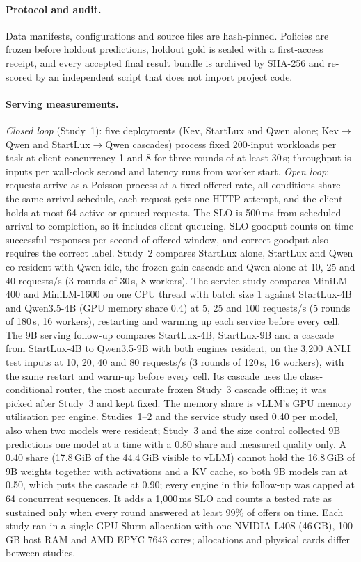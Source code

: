 \documentclass[11pt]{article}
\begin{document}
\paragraph{Protocol and audit.}
Data manifests, configurations and source files are hash-pinned. Policies are frozen before holdout predictions, holdout gold is sealed with a first-access receipt, and every accepted final result bundle is archived by SHA-256 and re-scored by an independent script that does not import project code.

\paragraph{Serving measurements.}
\emph{Closed loop} (Study~1): five deployments (Kev, StartLux and Qwen alone; Kev$\to$Qwen and StartLux$\to$Qwen cascades) process fixed 200-input workloads per task at client concurrency 1 and 8 for three rounds of at least 30\,s; throughput is inputs per wall-clock second and latency runs from worker start. \emph{Open loop}: requests arrive as a Poisson process at a fixed offered rate, all conditions share the same arrival schedule, each request gets one HTTP attempt, and the client holds at most 64 active or queued requests. The SLO is 500\,ms from scheduled arrival to completion, so it includes client queueing. SLO goodput counts on-time successful responses per second of offered window, and correct goodput also requires the correct label. Study~2 compares StartLux alone, StartLux and Qwen co-resident with Qwen idle, the frozen gain cascade and Qwen alone at 10, 25 and 40 requests/s (3 rounds of 30\,s, 8 workers). The service study compares MiniLM-400 and MiniLM-1600 on one CPU thread with batch size 1 against StartLux-4B and Qwen3.5-4B (GPU memory share 0.4) at 5, 25 and 100 requests/s (5 rounds of 180\,s, 16 workers), restarting and warming up each service before every cell. The 9B serving follow-up compares StartLux-4B, StartLux-9B and a cascade from StartLux-4B to Qwen3.5-9B with both engines resident, on the 3,200 ANLI test inputs at 10, 20, 40 and 80 requests/s (3 rounds of 120\,s, 16 workers), with the same restart and warm-up before every cell. Its cascade uses the class-conditional router, the most accurate frozen Study~3 cascade offline; it was picked after Study~3 and kept fixed. The memory share is vLLM's GPU memory utilisation per engine. Studies~1--2 and the service study used 0.40 per model, also when two models were resident; Study~3 and the size control collected 9B predictions one model at a time with a 0.80 share and measured quality only. A 0.40 share (17.8\,GiB of the 44.4\,GiB visible to vLLM) cannot hold the 16.8\,GiB of 9B weights together with activations and a KV cache, so both 9B models ran at 0.50, which puts the cascade at 0.90; every engine in this follow-up was capped at 64 concurrent sequences. It adds a 1,000\,ms SLO and counts a tested rate as sustained only when every round answered at least 99\% of offers on time. Each study ran in a single-GPU Slurm allocation with one NVIDIA L40S (46\,GB), 100\,GB host RAM and AMD EPYC 7643 cores; allocations and physical cards differ between studies.
\end{document}
